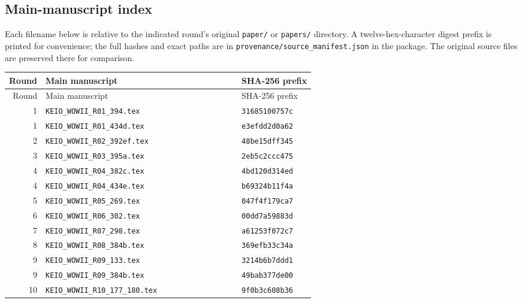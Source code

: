 \documentclass[11pt,a4paper]{article}
\theoremstyle{definition}\newtheorem{definition}[theorem]{Definition}
\theoremstyle{remark}\newtheorem{remark}[theorem]{Remark}
\begin{document}
\subsection{Main-manuscript index}
Each filename below is relative to the indicated round's original
\texttt{paper/} or \texttt{papers/} directory. A twelve-hex-character
digest prefix is printed for convenience; the full hashes and exact
paths are in \texttt{provenance/source\_manifest.json} in the package.
The original source files are preserved there for comparison.
\begin{longtable}{rp{0.64\linewidth}l}
\toprule
Round&Main manuscript&SHA-256 prefix\\\midrule
\endfirsthead
\toprule Round&Main manuscript&SHA-256 prefix\\\midrule
\endhead

1&\nolinkurl{KEIO_WOWII_R01_394.tex}&\texttt{31685100757c}\\

1&\nolinkurl{KEIO_WOWII_R01_434d.tex}&\texttt{e3efdd2d0a62}\\

2&\nolinkurl{KEIO_WOWII_R02_392ef.tex}&\texttt{48be15dff345}\\

3&\nolinkurl{KEIO_WOWII_R03_395a.tex}&\texttt{2eb5c2ccc475}\\

4&\nolinkurl{KEIO_WOWII_R04_382c.tex}&\texttt{4bd120d314ed}\\

4&\nolinkurl{KEIO_WOWII_R04_434e.tex}&\texttt{b69324b11f4a}\\

5&\nolinkurl{KEIO_WOWII_R05_269.tex}&\texttt{047f4f179ca7}\\

6&\nolinkurl{KEIO_WOWII_R06_302.tex}&\texttt{00dd7a59883d}\\

7&\nolinkurl{KEIO_WOWII_R07_298.tex}&\texttt{a61253f072c7}\\

8&\nolinkurl{KEIO_WOWII_R08_384b.tex}&\texttt{369efb33c34a}\\

9&\nolinkurl{KEIO_WOWII_R09_133.tex}&\texttt{3214b6b7ddd1}\\

9&\nolinkurl{KEIO_WOWII_R09_384b.tex}&\texttt{49bab377de00}\\

10&\nolinkurl{KEIO_WOWII_R10_177_180.tex}&\texttt{9f0b3c608b36}\\


\end{longtable}
\end{document}
